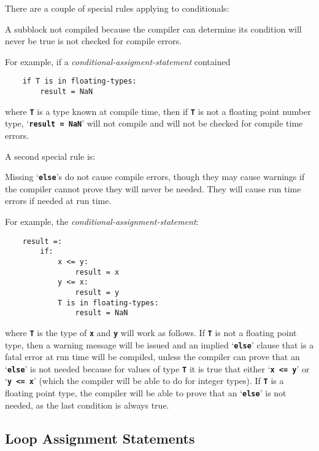 \documentclass[12pt]{article}
\newcommand{\TT}[1]{{\tt \bfseries #1}}
\newenvironment{indpar}[1][0.3in]%
	{\begin{list}{}%
		     {\setlength{\itemsep}{0in}%
		      \setlength{\topsep}{0in}%
		      \setlength{\parsep}{1ex}%
		      \setlength{\labelwidth}{#1}%
		      \setlength{\leftmargin}{#1}%
		      \addtolength{\leftmargin}{\labelsep}}%
	 \item}%
	{\end{list}}
\begin{document}
There are a couple of special rules applying to conditionals:%
\label{CONDITIONAL-SPECIAL-RULES}

\begin{indpar}
A subblock not compiled because the compiler can determine its
condition will never be true is not checked for compile errors.
\end{indpar}

For example, if a {\em conditional-assigment-statement}
contained
\begin{indpar}\begin{verbatim}
    if T is in floating-types:
        result = NaN
\end{verbatim}\end{indpar}
where \TT{T} is a type known at compile time,
then if \TT{T} is not a floating
point number type, `\TT{result = NaN}' will not compile
and will not be checked for compile time errors.


A second special rule is:

\begin{indpar}
Missing `\TT{else}'s do not cause compile errors, though they
may cause warnings if the compiler cannot prove they will never
be needed.  They will cause run time errors if needed at run time.
\end{indpar}

For example, the {\em conditional-assignment-statement}:
\begin{indpar}\begin{verbatim}
    result =:
        if:
            x <= y:
                result = x
            y <= x:
                result = y
            T is in floating-types:
                result = NaN
\end{verbatim}\end{indpar}
where \TT{T} is the type of \TT{x} and \TT{y} will work as
follows.  If \TT{T} is not a floating point type, then a
warning message will be issued and an implied `\TT{else}'
clause that is a fatal error at run time will be compiled, unless the
compiler can prove that an `\TT{else}' is not needed because
for values of type \TT{T} it is
true that either `\TT{x~<=~y}' or `\TT{y~<=~x}' (which
the compiler will be able to do for integer types).  If
\TT{T} is a floating point type, the compiler will be able
to prove that an `\TT{else}' is not needed, as the last condition
is always true.


\subsection{Loop Assignment Statements}
\label{LOOP-ASSIGNMENT-STATEMENTS}
\end{document}
